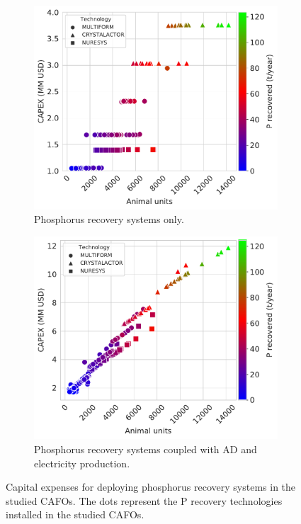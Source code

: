 \documentclass[authoryear]{elsarticle}
\begin{document}
\begin{figure}[H]
	\begin{subfigure}[t]{0.48\linewidth}
		\includegraphics[width=\linewidth]{Capital_TechSelected_Pcredits22_REC0.pdf} 
		\caption{Phosphorus recovery systems only.}
		\label{fig:Capital_TechSelected_Pcredits22_REC0}
	\end{subfigure}
	\quad
	\begin{subfigure}[t]{0.48\linewidth}
		\includegraphics[width=\linewidth]{Capital_TechSelected_Pcredits22_REC60.pdf}
		\caption{Phosphorus recovery systems coupled with AD and electricity production.}
		\label{fig:Capital_TechSelected_Pcredits22_REC60}
	\end{subfigure}
	
	\caption{Capital expenses for deploying phosphorus recovery systems in the studied CAFOs. The dots represent the P recovery technologies installed in the studied CAFOs.}
	\label{fig:Capital_TechSelected}
\end{figure}
\end{document}
